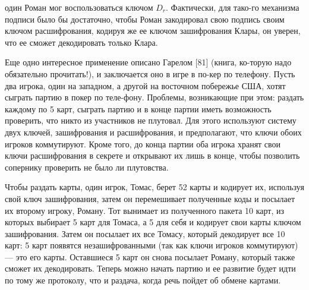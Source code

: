 \documentclass{mai_book}
\begin{document}
один Роман мог воспользоваться ключом $D_r$. Фактически, для 
тако-\linebreak го механизма подписи было бы достаточно, чтобы Роман закодировал
свою подпись своим ключом расшифрования, кодируя же ее ключом
зашифрования Клары, он уверен, что ее сможет декодировать только\linebreak
Клара.\par
 Еще одно интересное применение описано Гарелом [81] (книга, 
ко-\linebreak торую надо обязательно прочитать!), и заключается оно в игре в 
по-\linebreak кер по телефону. Пусть два игрока, один на западном, а другой на\linebreak
восточном побережье США, хотят сыграть партию в покер по теле-\linebreak фону. Проблемы, возникающие при этом: раздать каждому по 5 карт,\linebreak
сыграть партию и в конце партии иметь возможность проверить, что\linebreak
никто из участников не плутовал. Для этого используют систему двух\linebreak
ключей, зашифрования и расшифрования, и предполагают, что ключи\linebreak
обоих игроков коммутируют. Кроме того, до конца партии оба игрока\linebreak
хранят свои ключи расшифрования в секрете и открывают их лишь в\linebreak
конце, чтобы позволить сопернику проверить не было ли плутовства.

\newpage

Чтобы раздать карты, один игрок, Томас, берет 52 карты и 
кодирует их, используя свой ключ зашифрования, затем он перемешивает
полученные коды и посылает их второму игроку, Роману. Тот 
вынимает из полученного пакета 10 карт, из которых выбирает 5 карт для
Томаса, а 5 для себя и кодирует свои карты ключом зашифрования.
Затем он посылает их все Томасу, который декодирует все 10 карт: 5
карт появятся незашифрованными (так как ключи игроков 
коммутируют) --- это его карты. Оставшиеся 5 карт он снова посылает Роману,
который также сможет их декодировать. Теперь можно начать партию
и ее развитие будет идти по тому же протоколу, что и раздача, когда
речь пойдет об обмене картами.\\
\subsectiontop
\end{document}
